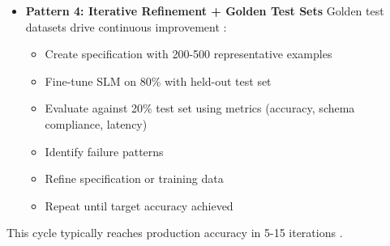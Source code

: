 \documentclass[11pt,a4paper]{article}
\begin{document}
\begin{itemize}
\item \textbf{Pattern 4: Iterative Refinement + Golden Test Sets} \newline
Golden test datasets drive continuous improvement \cite{nvidia2025}:
\begin{itemize}
    \item Create specification with 200-500 representative examples
    \item Fine-tune SLM on 80\% with held-out test set
    \item Evaluate against 20\% test set using metrics (accuracy, schema compliance, latency)
    \item Identify failure patterns
    \item Refine specification or training data
    \item Repeat until target accuracy achieved
\end{itemize}
\end{itemize}
This cycle typically reaches production accuracy in 5-15 iterations \cite{nvidia2025}.
\end{document}
